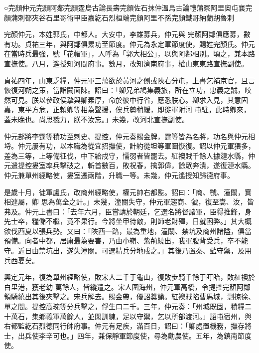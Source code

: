 
\begin{pinyinscope}

 ○完顏仲元完顏阿鄰完顏霆烏古論長壽完顏佐石抹仲溫烏古論禮蒲察阿里奧屯襄完顏蒲剌都夾谷石里哥術甲臣嘉紇石烈桓端完顏阿里不孫完顏鐵哥納蘭胡魯剌



 完顏仲元，本姓郭氏，中都人。大安中，李雄募兵，仲元與
 完顏阿鄰俱應募，數有功。貞祐三年，與阿鄰俱累功至節度。仲元為永定軍節度使，賜姓完顏氏。仲元在當時兵最強，號「花帽軍」，人呼為「郭大相公」，以與阿鄰相別。頃之，兼本路宣撫使。八月，遙授知河間府事。數月，改知濟南府事，權山東東路宣撫副使。



 貞祐四年，山東乏糧，仲元軍三萬欲於黃河之側或陜右分屯，上書乞補京官，且言恢復河朔之策，當詣闕面陳。詔曰：「卿兄弟鳩集義旅，所在立功，忠義之誠，皎然可見。朕以參政侯摯與卿素厚，命於彼中行省，應悉朕心。卿求入見，其意固嘉，東平方危，正賴卿等相為聲援，俟兵勢稍緩，即徙軍附河
 屯駐，此時卿來，蓋未晚也。尚思戮力，朕不汝忘。」未幾，改河北宣撫副使。



 仲元部將李霆等積功至刺史、提控，仲元奏賜金牌，霆等皆為名將，功名與仲元相埒。仲元屢有功，以本職為從宜招撫使，計約從坦等軍圖恢復。詔以仲元軍猥多，差為三等，上等備征伐，中下給戍守，懦弱者皆罷去。紅襖賊千餘人據漣水縣，仲元遣提控婁室率兵擊破之，斬首數百，敗祝春，擒郭偉，餘眾奔潰，遂復漣水縣。仲元兼單州經略使，婁室遷兩階，升職一等。未幾，仲元遙授知歸德府事。



 是歲十月，徙軍盧氏，改商州經略使，權元帥右都監。詔曰：「商、虢、潼關，實相連屬，卿
 思為萬全之計。」未幾，潼關失守，仲元軍趨商、虢，復至嵩、汝，皆弗及。仲元上書曰：「去年六月，臣嘗請於朝廷，乞選名將督諸軍，臣得推鋒，身先士卒，糧儲不繼，竟不果行。今將坐甲待敵，則師老財殫，日就困弊。」其大概欲伐西夏以張兵勢。又曰：「陜西一路，最為重地，潼關、禁坑及商州諸隘，俱當預備。向者中都，居庸最為要害，乃由小嶺、紫荊繞出，我軍腹背受兵，卒不能守。近日由禁坑出，遂失潼關。可選精兵分地戍之。」其後乃置秦、藍守禦，及用兵西夏矣。



 興定元年，復為單州經略使，敗宋人二千于龜山，復敗步騎千餘于盱眙，敗紅襖於白里港，獲老幼
 萬餘人，皆縱遣之。宋人圍海州，仲元軍高橋，令提控完顏阿鄰領騎繞出其後夾擊之。宋兵解去。賜金帶，優詔獎諭。紅襖賊陷曹馬城，剽掠徐、單之間。提控高琬等分兵擊之，俘生口二千。三年，仲元奏：「州城既固，積糧二十萬石，集鄉義軍萬餘人，並閑訓練，足以守禦，乞以所部渡河。」詔屯宿州，與右都監紇石烈德同行帥府事。仲元有足疾，滿百日，詔曰：「卿處置機務，撫存將士，出兵使李辛可也。」四年，兼保靜軍節度使，尋為勸農使。五年，為鎮南節度使。




\end{pinyinscope}
